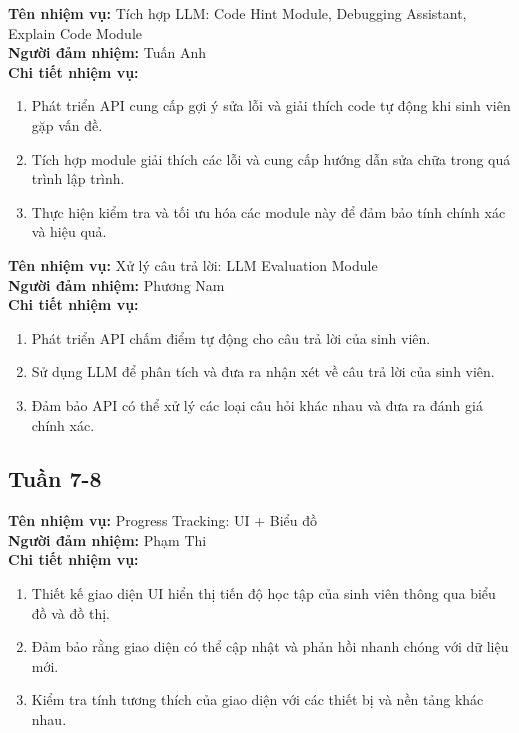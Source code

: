 \noindent \textbf{Tên nhiệm vụ:} Tích hợp LLM: Code Hint Module, Debugging Assistant, Explain Code Module \\
\noindent \textbf{Người đảm nhiệm:} Tuấn Anh \\
\noindent \textbf{Chi tiết nhiệm vụ:} 
\begin{enumerate}[label=-]
    \item Phát triển API cung cấp gợi ý sửa lỗi và giải thích code tự động khi sinh viên gặp vấn đề. 
    \item Tích hợp module giải thích các lỗi và cung cấp hướng dẫn sửa chữa trong quá trình lập trình. 
    \item Thực hiện kiểm tra và tối ưu hóa các module này để đảm bảo tính chính xác và hiệu quả.
\end{enumerate}

\noindent \textbf{Tên nhiệm vụ:} Xử lý câu trả lời: LLM Evaluation Module \\
\noindent \textbf{Người đảm nhiệm:} Phương Nam \\
\noindent \textbf{Chi tiết nhiệm vụ:} 
\begin{enumerate}[label=-]
    \item Phát triển API chấm điểm tự động cho câu trả lời của sinh viên. 
    \item Sử dụng LLM để phân tích và đưa ra nhận xét về câu trả lời của sinh viên. 
    \item Đảm bảo API có thể xử lý các loại câu hỏi khác nhau và đưa ra đánh giá chính xác.
\end{enumerate}

\subsection*{Tuần 7-8}

\noindent \textbf{Tên nhiệm vụ:} Progress Tracking: UI + Biểu đồ \\
\noindent \textbf{Người đảm nhiệm:} Phạm Thi \\
\noindent \textbf{Chi tiết nhiệm vụ:} 
\begin{enumerate}[label=-]
    \item Thiết kế giao diện UI hiển thị tiến độ học tập của sinh viên thông qua biểu đồ và đồ thị. 
    \item Đảm bảo rằng giao diện có thể cập nhật và phản hồi nhanh chóng với dữ liệu mới. 
    \item Kiểm tra tính tương thích của giao diện với các thiết bị và nền tảng khác nhau.
\end{enumerate}

